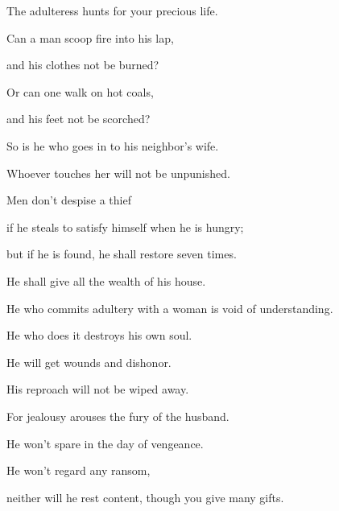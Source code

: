 {\par }{\QB The adulteress hunts for your precious life.
\par }{\Q {}Can a man scoop fire into his lap,
\par }{\QB and his clothes not be burned?
\par }{\Q {}Or can one walk on hot coals,
\par }{\QB and his feet not be scorched?
\par }{\Q {}So is he who goes in to his neighbor’s wife.
\par }{\QB Whoever touches her will not be unpunished.
\par }{\Q {}Men don’t despise a thief
\par }{\QB if he steals to satisfy himself when he is hungry;
\par }{\Q {}but if he is found, he shall restore seven times.
\par }{\QB He shall give all the wealth of his house.
\par }{\Q {}He who commits adultery with a woman is void of understanding.
\par }{\QB He who does it destroys his own soul.
\par }{\Q {}He will get wounds and dishonor.
\par }{\QB His reproach will not be wiped away.
\par }{\Q {}For jealousy arouses the fury of the husband.
\par }{\QB He won’t spare in the day of vengeance.
\par }{\Q {}He won’t regard any ransom,
\par }{\QB neither will he rest content, though you give many gifts.

}
